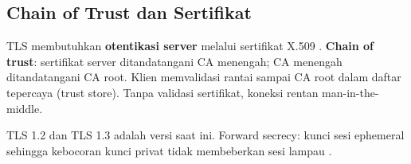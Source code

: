 \subsection{Chain of Trust dan Sertifikat}

TLS membutuhkan \textbf{otentikasi server} melalui sertifikat X.509 \cite{stallings2017}. \textbf{Chain of trust}: sertifikat server ditandatangani CA menengah; CA menengah ditandatangani CA root. Klien memvalidasi rantai sampai CA root dalam daftar tepercaya (trust store). Tanpa validasi sertifikat, koneksi rentan man-in-the-middle.

TLS 1.2 dan TLS 1.3 adalah versi saat ini. Forward secrecy: kunci sesi ephemeral sehingga kebocoran kunci privat tidak membeberkan sesi lampau \cite{stallings2017}.

